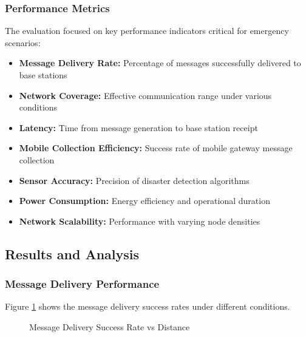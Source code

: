 \documentclass[conference]{IEEEtran}
\begin{document}
\subsubsection{Performance Metrics}
The evaluation focused on key performance indicators critical for emergency scenarios:

\begin{itemize}
\item \textbf{Message Delivery Rate:} Percentage of messages successfully delivered to base stations
\item \textbf{Network Coverage:} Effective communication range under various conditions
\item \textbf{Latency:} Time from message generation to base station receipt
\item \textbf{Mobile Collection Efficiency:} Success rate of mobile gateway message collection
\item \textbf{Sensor Accuracy:} Precision of disaster detection algorithms
\item \textbf{Power Consumption:} Energy efficiency and operational duration
\item \textbf{Network Scalability:} Performance with varying node densities
\end{itemize}

\subsection{Results and Analysis}

\subsubsection{Message Delivery Performance}

Figure \ref{fig:delivery_performance} shows the message delivery success rates under different conditions.

\begin{figure}[htbp]
\centering
{}
\caption{Message Delivery Success Rate vs Distance}
\label{fig:delivery_performance}
\end{figure}
\end{document}
